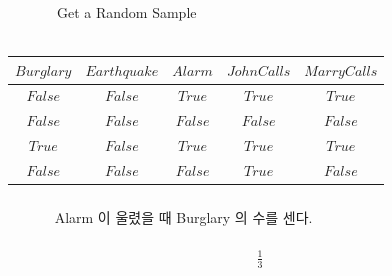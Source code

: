 \documentclass[a4paper]{article}
\begin{document}
\subsubsection{} %
~~~~~~~Get a Random Sample \\


~~~~~~~~\begin{tabular}{@{}ccccc@{}}
\toprule
$Burglary$ & $Earthquake$ & $Alarm$ & $JohnCalls$ & $MarryCalls$\\ \midrule
$False$ & $False$ & $True$ & $True$ & $True$ \\
$False$ & $False$ & $False$ & $False$ & $False$ \\
$True$ & $False$ & $True$ & $True$ & $True$ \\
$False$ & $False$ & $False$ & $True$ & $False$ \\
\bottomrule
\end{tabular}


\subsubsection{} %
~~~~~~ Alarm 이 울렸을 때 Burglary 의 수를 센다. \\ 
~~~~~~\begin{gather*}
\frac{1}{3}
\end{gather*}


\end{document}
